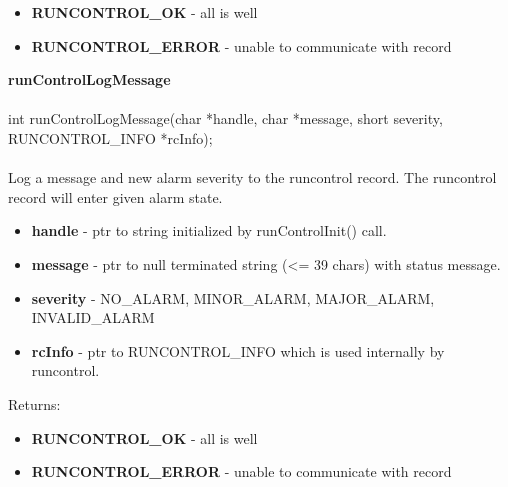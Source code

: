 \documentclass[11pt]{article}
\begin{document}
\begin{itemize}
\item {\bf RUNCONTROL\_OK} - all is well
\item {\bf RUNCONTROL\_ERROR} - unable to communicate with record
\end{itemize}
{\bf runControlLogMessage}\\
\\
int runControlLogMessage(char *handle, char *message, short severity, RUNCONTROL\_INFO *rcInfo);\\
\\
Log a message and new alarm severity to the runcontrol record. The runcontrol record will enter given alarm state.

\begin{itemize}
\item {\bf handle} - ptr to string initialized by runControlInit() call.
\item {\bf message} - ptr to null terminated string (<= 39 chars) with status message.
\item {\bf severity} - NO\_ALARM, MINOR\_ALARM, MAJOR\_ALARM, INVALID\_ALARM
\item {\bf rcInfo} - ptr to RUNCONTROL\_INFO which is used internally by runcontrol.
\end{itemize}
Returns:

\begin{itemize}
\item {\bf RUNCONTROL\_OK} - all is well
\item {\bf RUNCONTROL\_ERROR} - unable to communicate with record
\end{itemize}
\end{document}
